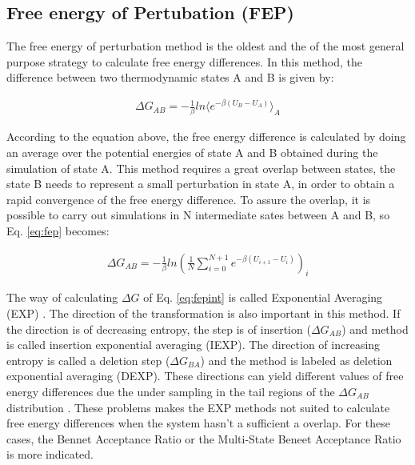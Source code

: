 \subsection{Free energy of Pertubation (FEP)}

The free energy of perturbation method \cite{zwanzig1954} is the oldest and the of the most general purpose strategy to calculate free energy differences. In this method, the difference between two thermodynamic states A and B is given by:

\begin{equation}
\label{eq:fep}
\begin{aligned}
\Delta G_{AB} = -\frac{1}{\beta} ln \langle{e^{-\beta (U_{B}-U_{A})}}\rangle_{A}
\end{aligned}
\end{equation}

According to the equation above, the free energy difference is calculated by doing an average over the potential energies of state A and B obtained during the simulation of state A. This method requires a great overlap between states, the state B needs to represent a small perturbation in state A, in order to obtain a rapid convergence of the free energy difference. To assure the overlap, it is possible to carry out simulations in N intermediate sates between A and B, so Eq. \eqref{eq:fep} becomes:

\begin{equation}
\label{eq:fepint}
\begin{aligned}
\Delta G_{AB} = -\frac{1}{\beta} ln \left(\frac{1}{N}\sum_{i=0}^{N+1}
{e^{-\beta (U_{i+1}-U_{i})}}\right)_{i}
\end{aligned}
\end{equation}

The way of calculating $\Delta G$ of Eq. \eqref{eq:fepint} is called Exponential Averaging (EXP) \cite{zwanzig1955,bareva}. The direction of the transformation is also important in this method. If the direction is of decreasing entropy, the step is of insertion ($\Delta G_{AB}$) and method is called insertion exponential averaging (IEXP). The direction of increasing entropy is  called a deletion step ($\Delta G_{BA}$) and the method is labeled as deletion exponential averaging (DEXP). These directions can yield different values of free energy differences due the under sampling in the tail regions of the $\Delta G_{AB}$ distribution \cite{klimovich,pohorille2010}. These problems makes the EXP methods not suited to calculate free energy differences when the system hasn't a sufficient a overlap. For these cases, the Bennet Acceptance Ratio or the Multi-State Beneet Acceptance Ratio is more indicated.   

